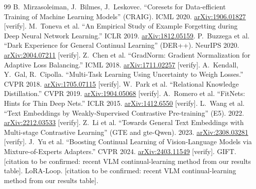 \documentclass[11pt]{article}
\begin{document}
\begin{thebibliography}{99}
 B.\ Mirzasoleiman, J.\ Bilmes, J.\ Leskovec. ``Coresets for Data-efficient Training of Machine Learning Models'' (CRAIG). ICML 2020. \href{https://arxiv.org/abs/1906.01827}{arXiv:1906.01827} [verify].
 M.\ Toneva et al. ``An Empirical Study of Example Forgetting during Deep Neural Network Learning.'' ICLR 2019. \href{https://arxiv.org/abs/1812.05159}{arXiv:1812.05159}.
 P.\ Buzzega et al. ``Dark Experience for General Continual Learning'' (DER++). NeurIPS 2020. \href{https://arxiv.org/abs/2004.07211}{arXiv:2004.07211} [verify].
 Z.\ Chen et al. ``GradNorm: Gradient Normalization for Adaptive Loss Balancing.'' ICML 2018. \href{https://arxiv.org/abs/1711.02257}{arXiv:1711.02257} [verify].
 A.\ Kendall, Y.\ Gal, R.\ Cipolla. ``Multi-Task Learning Using Uncertainty to Weigh Losses.'' CVPR 2018. \href{https://arxiv.org/abs/1705.07115}{arXiv:1705.07115} [verify].
 W.\ Park et al. ``Relational Knowledge Distillation.'' CVPR 2019. \href{https://arxiv.org/abs/1904.05068}{arXiv:1904.05068} [verify].
 A.\ Romero et al. ``FitNets: Hints for Thin Deep Nets.'' ICLR 2015. \href{https://arxiv.org/abs/1412.6550}{arXiv:1412.6550} [verify].
 L.\ Wang et al. ``Text Embeddings by Weakly-Supervised Contrastive Pre-training'' (E5). 2022. \href{https://arxiv.org/abs/2212.03533}{arXiv:2212.03533} [verify].
 Z.\ Li et al. ``Towards General Text Embeddings with Multi-stage Contrastive Learning'' (GTE and gte-Qwen). 2023. \href{https://arxiv.org/abs/2308.03281}{arXiv:2308.03281} [verify].
 J.\ Yu et al. ``Boosting Continual Learning of Vision-Language Models via Mixture-of-Experts Adapters.'' CVPR 2024. \href{https://arxiv.org/abs/2403.11549}{arXiv:2403.11549} [verify].
 GIFT. [citation to be confirmed: recent VLM continual-learning method from our results table].
 LoRA-Loop. [citation to be confirmed: recent VLM continual-learning method from our results table].
\end{thebibliography}
\end{document}
